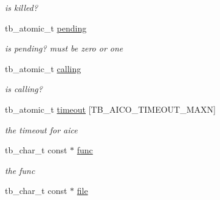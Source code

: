 \begin{DoxyCompactItemize}
\begin{DoxyCompactList}\small\item\em is killed? \end{DoxyCompactList}\item 
\hypertarget{structtb__aico__t_ad2dceb1181c41cc3f4660615747bb7a6}{tb\-\_\-atomic\-\_\-t \hyperlink{structtb__aico__t_ad2dceb1181c41cc3f4660615747bb7a6}{pending}}\label{structtb__aico__t_ad2dceb1181c41cc3f4660615747bb7a6}

\begin{DoxyCompactList}\small\item\em is pending? must be zero or one \end{DoxyCompactList}\item 
\hypertarget{structtb__aico__t_a1778a8290d7d99984506138f8d2241b6}{tb\-\_\-atomic\-\_\-t \hyperlink{structtb__aico__t_a1778a8290d7d99984506138f8d2241b6}{calling}}\label{structtb__aico__t_a1778a8290d7d99984506138f8d2241b6}

\begin{DoxyCompactList}\small\item\em is calling? \end{DoxyCompactList}\item 
\hypertarget{structtb__aico__t_a5f9ea8ac3cb8616b1d8e1f0b9e8d5f75}{tb\-\_\-atomic\-\_\-t \hyperlink{structtb__aico__t_a5f9ea8ac3cb8616b1d8e1f0b9e8d5f75}{timeout} \mbox{[}T\-B\-\_\-\-A\-I\-C\-O\-\_\-\-T\-I\-M\-E\-O\-U\-T\-\_\-\-M\-A\-X\-N\mbox{]}}\label{structtb__aico__t_a5f9ea8ac3cb8616b1d8e1f0b9e8d5f75}

\begin{DoxyCompactList}\small\item\em the timeout for aice \end{DoxyCompactList}\item 
\hypertarget{structtb__aico__t_aa7b9b5668cbc6b0231e86fe11ed6b107}{tb\-\_\-char\-\_\-t const $\ast$ \hyperlink{structtb__aico__t_aa7b9b5668cbc6b0231e86fe11ed6b107}{func}}\label{structtb__aico__t_aa7b9b5668cbc6b0231e86fe11ed6b107}

\begin{DoxyCompactList}\small\item\em the func \end{DoxyCompactList}\item 
\hypertarget{structtb__aico__t_ab8dc7a78e79e994b3198dffae5101d27}{tb\-\_\-char\-\_\-t const $\ast$ \hyperlink{structtb__aico__t_ab8dc7a78e79e994b3198dffae5101d27}{file}}\label{structtb__aico__t_ab8dc7a78e79e994b3198dffae5101d27}


\end{DoxyCompactItemize}
